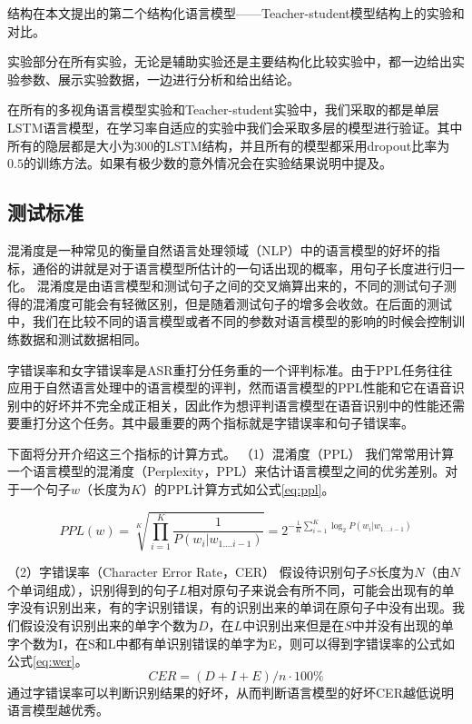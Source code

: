 结构在本文提出的第二个结构化语言模型——Teacher-student模型结构上的实验和对比。

实验部分在所有实验，无论是辅助实验还是主要结构化比较实验中，都一边给出实验参数、展示实验数据，一边进行分析和给出结论。


在所有的多视角语言模型实验和Teacher-student实验中，我们采取的都是单层LSTM语言模型，在学习率自适应的实验中我们会采取多层的模型进行验证。其中所有的隐层都是大小为300的LSTM结构，并且所有的模型都采用dropout比率为$0.5$的训练方法。如果有极少数的意外情况会在实验结果说明中提及。



\subsection{测试标准}

混淆度是一种常见的衡量自然语言处理领域（NLP）中的语言模型的好坏的指标，通俗的讲就是对于语言模型所估计的一句话出现的概率，用句子长度进行归一化。          
混淆度是由语言模型和测试句子之间的交叉熵算出来的，不同的测试句子测得的混淆度可能会有轻微区别，但是随着测试句子的增多会收敛。在后面的测试中，我们在比较不同的语言模型或者不同的参数对语言模型的影响的时候会控制训练数据和测试数据相同。

字错误率和女字错误率是ASR重打分任务重的一个评判标准。由于PPL任务往往应用于自然语言处理中的语言模型的评判，然而语言模型的PPL性能和它在语音识别中的好坏并不完全成正相关，因此作为想评判语言模型在语音识别中的性能还需要重打分这个任务。其中最重要的两个指标就是字错误率和句子错误率。

下面将分开介绍这三个指标的计算方式。
（1）混淆度（PPL）
我们常常用计算一个语言模型的混淆度（Perplexity，PPL）来估计语言模型之间的优劣差别。对于一个句子$w$（长度为$K$）的PPL计算方式如公式\ref{eq:ppl}。

\begin{equation}
	\label{eq:ppl}
   	PPL( w ) = \sqrt[K]{{\prod\limits_{i = 1}^K {\frac{1}{{P\left( {{w_i}|{w_{1....i - 1}}} \right)}}} }}
      = {2^{ - \frac{1}{K}\sum\limits_{i = 1}^K {{{\log }_2}P\left( {{w_i}|{w_{1....i - 1}}} \right)}}}
\end{equation}

（2）字错误率（Character Error Rate，CER）
假设待识别句子$S$长度为$N$（由$N$个单词组成），识别得到的句子$L$相对原句子来说会有所不同，可能会出现有的单字没有识别出来，有的字识别错误，有的识别出来的单词在原句子中没有出现。我们假设没有识别出来的单字个数为$D$，在$L$中识别出来但是在$S$中并没有出现的单字个数为I，在S和L中都有单识别错误的单字为E，则可以得到字错误率的公式如公式\ref{eq:wer}。
\begin{equation}
	\label{eq:wer}
    CER = (D+I+E)/n \cdot 100\%
\end{equation}
通过字错误率可以判断识别结果的好坏，从而判断语言模型的好坏CER越低说明语言模型越优秀。

